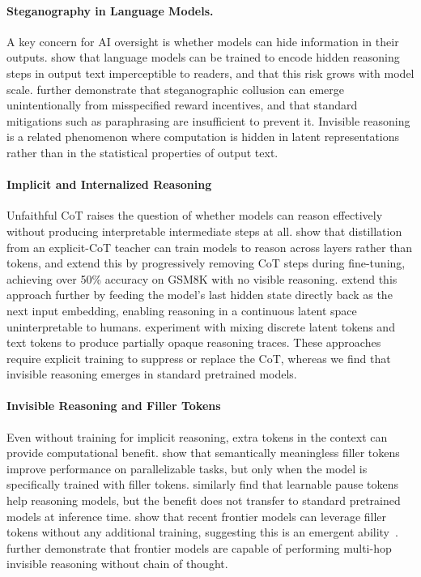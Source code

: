 \documentclass{article}
\begin{document}
\paragraph{Steganography in Language Models.}
A key concern for AI oversight is whether models can hide information in their outputs. \citet{roger2023preventinglanguagemodelshiding} show that language models can be trained to encode hidden reasoning steps in output text imperceptible to readers, and that this risk grows with model scale. \citet{mathew2024hiddeninplaintext} further demonstrate that steganographic collusion can emerge unintentionally from misspecified reward incentives, and that standard mitigations such as paraphrasing are insufficient to prevent it. Invisible reasoning is a related phenomenon where computation is hidden in latent representations rather than in the statistical properties of output text.

\paragraph{Implicit and Internalized Reasoning}
Unfaithful CoT raises the question of whether models can reason effectively without producing interpretable intermediate steps at all. \citet{deng2023implicitchainofthought} show that distillation from an explicit-CoT teacher can train models to reason across layers rather than tokens, and \citet{deng2024explicitcotimplicitcot} extend this by progressively removing CoT steps during fine-tuning, achieving over 50\% accuracy on GSM8K with no visible reasoning. \citet{hao2024coconut} extend this approach further by feeding the model's last hidden state directly back as the next input embedding, enabling reasoning in a continuous latent space uninterpretable to humans. \citet{su2025tokenassorted} experiment with mixing discrete latent tokens and text tokens to produce partially opaque reasoning traces. These approaches require explicit training to suppress or replace the CoT, whereas we find that invisible reasoning emerges in standard pretrained models.

\paragraph{Invisible Reasoning and Filler Tokens}
Even without training for implicit reasoning, extra tokens in the context can provide computational benefit. \citet{pfau2024letsthinkdotdot} show that semantically meaningless filler tokens improve performance on parallelizable tasks, but only when the model is specifically trained with filler tokens. \citet{goyal2024thinkspeaktraininglanguage} similarly find that learnable pause tokens help reasoning models, but the benefit does not transfer to standard pretrained models at inference time. \citet{greenblatt2024counting} show that recent frontier models can leverage filler tokens without any additional training, suggesting this is an emergent ability~\citep{wei2022emergentabilitieslargelanguage}. \citet{balesni2025lessonsstudyingtwohop} further demonstrate that frontier models are capable of performing multi-hop invisible reasoning without chain of thought.
\end{document}
